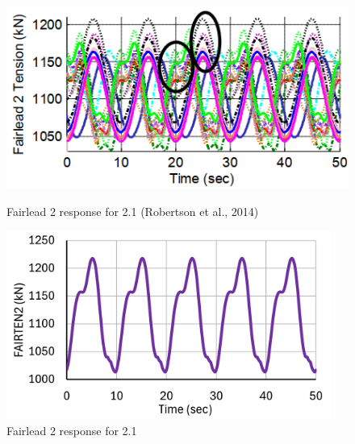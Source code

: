 \documentclass[a4paper]{article}
\begin{document}
\begin{figure}[H]
    \begin{minipage}{0.49\textwidth}
        \centering
        \includegraphics[width=1\textwidth]{2.1_fairten2.png}
        \caption{\small Fairlead 2 response for 2.1 (Robertson et al., 2014)}
        \label{fig:2.1_fairten2}
    \end{minipage}
    \hfill
    \begin{minipage}{0.5\textwidth}
        \centering
        \vspace{-0.6cm}
        \includegraphics[width=0.95\textwidth]{2.1_fairten2_mine.png}
        \caption{\small Fairlead 2 response for 2.1}
        \label{fig:2.1_fairten2_mine}
    \end{minipage}
\end{figure}
\end{document}
